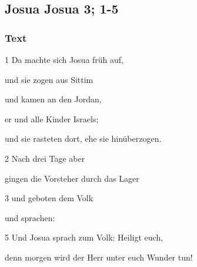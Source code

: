\subsection{Josua Josua 3; 1-5}
\subsubsection{Text}

1 Da machte sich Josua früh auf, 

und sie zogen aus Sittim 

und kamen an den Jordan, 

er und alle Kinder Israels; 

und sie rasteten dort, ehe sie hinüberzogen.

2 Nach drei Tage aber 

gingen die Vorsteher durch das Lager

3 und geboten dem Volk 

und sprachen: 

5 Und Josua sprach zum Volk: Heiligt euch, 

denn morgen wird der Herr unter euch Wunder tun!

